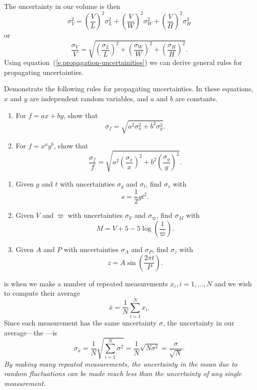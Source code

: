 The uncertainty in our volume is then
\begin{equation}\label{e.uncertainty-volume}
	\sigma_{V}^{2} = \left(\frac{V}{L}\right)^{2}\sigma_{L}^{2}
		+ \left(\frac{V}{W}\right)^{2}\sigma_{W}^{2}
		+ \left(\frac{V}{H}\right)^{2}\sigma_{H}^{2}
\end{equation}
or
\[ \frac{\sigma_{V}}{V} = 
	\sqrt{\left(\frac{\sigma_{L}}{L}\right)^{2}
	+ \left(\frac{\sigma_{W}}{W}\right)^{2}
	+ \left(\frac{\sigma_{H}}{H}\right)^{2} }.
\]
Using equation~(\ref{e.propagation-uncertainities}) we can derive general rules for propagating uncertainties.

\begin{exercisebox}
Demonstrate the following rules for propagating uncertainties. In these equations, $x$ and $y$ are independent random variables, and $a$ and $b$ are constants.
\begin{enumerate}
\item For $f = ax + by$, show that 
\[ \sigma_{f} = \sqrt{ a^{2}\sigma_{x}^{2} + b^{2}\sigma_{y}^{2}}. \]
\item For $f = x^{a}y^{b}$, show that
\[ 
	\frac{\sigma_{f}}{f} = \sqrt{ a^{2}\left(\frac{\sigma_{x}}{x}\right)^{2} 
		+ b^{2}\left(\frac{\sigma_{y}}{y}\right)^{2} }.
\]
\end{enumerate}
\end{exercisebox}

\begin{exercisebox}
\begin{enumerate}
\item Given $g$ and $t$ with uncertainties $\sigma_{g}$ and $\sigma_{t}$, find $\sigma_{s}$ with
\[	s = \frac{1}{2}gt^{2}.	\]
\item Given $V$ and $\varpi$ with uncertainties $\sigma_{V}$ and $\sigma_{\varpi}$, find $\sigma_{M}$ with
\[	M = V + 5 - 5\log\left(\frac{1}{\varpi}\right).	\]
\item Given $A$ and $P$ with uncertainties $\sigma_{A}$ and $\sigma_{P}$, find $\sigma_{z}$ with
\[	z = A\sin\left(\frac{2\pi t}{P}\right).	\]
\end{enumerate}
\end{exercisebox}

 is when we make a number of repeated measurements $x_{i}, i=1,\ldots,N$ and we wish to compute their average
\[ \bar{x} = \frac{1}{N}\sum_{i=1}^{N}x_{i} . \]
Since each measurement has the same uncertainty $\sigma$, the uncertainty in our average---the ---is
\begin{equation}\label{e.error-mean}
 \sigma_{\bar{x}} = \frac{1}{N}\sqrt{\sum_{i=1}^{N}\sigma^{2}}
 	= \frac{1}{N}\sqrt{N\sigma^{2}}
  = \frac{\sigma}{\sqrt{N}}.
\end{equation}
\emph{By making many repeated measurements, the uncertainty in the mean due to random fluctuations can be made much less than the uncertainty of any single measurement.}

